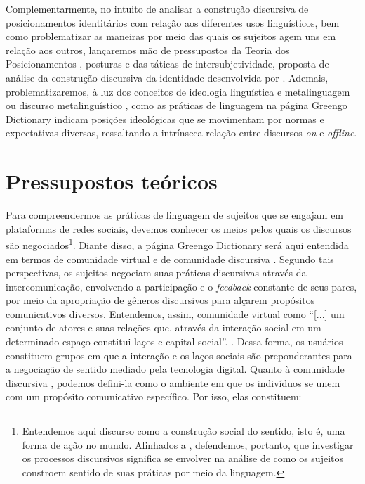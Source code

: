 \documentclass[portuguese]{textolivre}
\begin{document}
Complementarmente, no intuito de analisar a construção discursiva de posicionamentos identitários com relação aos diferentes usos linguísticos, bem como  problematizar as maneiras por meio das quais os sujeitos agem uns em relação aos outros, lançaremos mão de pressupostos da Teoria dos Posicionamentos \cite{harre_positioning_1999}, posturas \cite{barton_linguagem_2015} e das táticas de intersubjetividade, proposta de análise da construção discursiva da identidade desenvolvida por \textcite{bucholtz_language_2004,bucholtz_identity_2005}. Ademais, problematizaremos, à luz dos conceitos de ideologia linguística \cite{moita_lopes_ingles_2008,moita_lopes_ideologia_2013} e metalinguagem ou discurso metalinguístico \cite{barton_linguagem_2015}, como as práticas de linguagem na página Greengo Dictionary indicam posições ideológicas que se movimentam por normas e expectativas diversas, ressaltando a intrínseca relação entre discursos \textit{on} e \textit{offline}.

\section{Pressupostos teóricos}\label{sec-normas}
Para compreendermos as práticas de linguagem de sujeitos que se engajam em plataformas de redes sociais, devemos conhecer os meios pelos quais os discursos são negociados\footnote{Entendemos aqui discurso como a construção social do sentido, isto é, uma forma de ação no mundo. Alinhados a \textcite{moita_lopes_identidades_2002}, defendemos, portanto, que investigar os processos discursivos significa se envolver na análise de como os sujeitos constroem sentido de suas práticas por meio da linguagem.}. Diante disso, a página Greengo Dictionary será aqui entendida em termos de comunidade virtual e de comunidade discursiva \cite{swales_repensando_1992,araujo_comunidade_2020}. Segundo tais perspectivas, os sujeitos negociam suas práticas discursivas através da intercomunicação, envolvendo a participação e o \textit{feedback} constante de seus pares, por meio da apropriação de gêneros discursivos para alçarem propósitos comunicativos diversos. Entendemos, assim, comunidade virtual como “[...] um conjunto de atores e suas relações que, através da interação social em um determinado espaço constitui laços e capital social”. \cite[p. 144]{recuero_comunidades_2009}. Dessa forma, os usuários constituem grupos em que a interação e os laços sociais são preponderantes para a negociação de sentido mediado pela tecnologia digital.	Quanto à comunidade discursiva \cite{swales_repensando_1992,rampazzo_revisitar_2019,araujo_comunidade_2020}, podemos defini-la como o ambiente em que os indivíduos se unem com um propósito comunicativo específico. Por isso, elas constituem:
\end{document}
